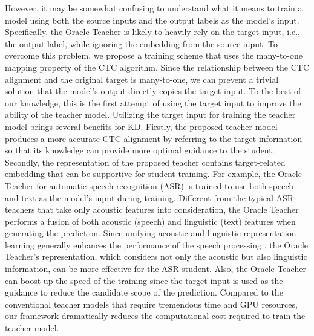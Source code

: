 \documentclass[journal]{IEEEtran}
\begin{document}
However, it may be somewhat confusing to understand what it means to train a model using both the source inputs and the output labels as the model's input.
Specifically, the Oracle Teacher is likely to heavily rely on the target input, i.e., the output label, while ignoring the embedding from the source input.
To overcome this problem, we propose a training scheme that uses the many-to-one mapping property of the CTC algorithm.
Since the relationship between the CTC alignment and the original target is many-to-one, 
we can prevent a trivial solution that the model's output directly copies the target input.
To the best of our knowledge, this is the first attempt of using the target input to improve the ability of the teacher model.
Utilizing the target input for training the teacher model brings several benefits for KD. Firstly, the proposed teacher model produces a more accurate CTC alignment by referring to the target information so that its knowledge can provide more optimal guidance to the student.
Secondly, the representation of the proposed teacher contains target-related embedding that can be supportive for student training. 
For example, the Oracle Teacher for automatic speech recognition (ASR) is trained to use both speech and text as the model's input during training.
Different from the typical ASR teachers that take only acoustic features into consideration, the Oracle Teacher performs a fusion of both acoustic (speech) and linguistic (text) features when generating the prediction.
Since unifying acoustic and linguistic representation learning generally enhances the performance of the speech processing \cite{acours_lin1,acours_lin2,acours_lin3,acours_lin4,acours_lin5}, the Oracle Teacher's representation, which considers not only the acoustic but also linguistic information, can be more effective for the ASR student.
Also, the Oracle Teacher can boost up the speed of the training since the target input is used as the guidance to reduce the candidate scope of the prediction. Compared to the conventional teacher models that require tremendous time and GPU resources, our framework dramatically reduces the computational cost required to train the teacher model.

\end{document}
